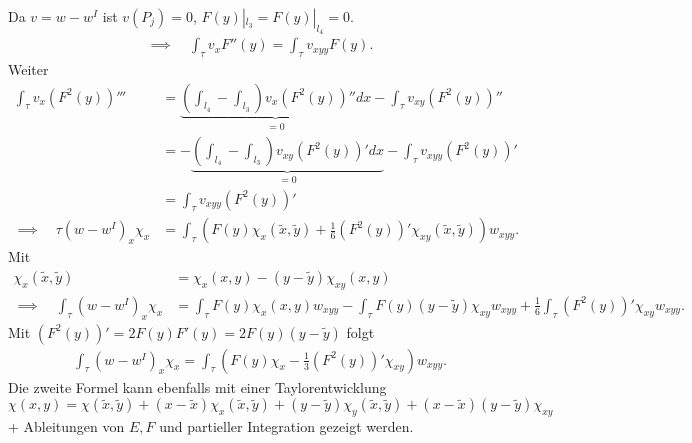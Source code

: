 \begin{beweis}
 Da $v = w - w^{I}$ ist $v(P_{j}) = 0$, $F(y)|_{l_{3}} = F(y)|_{l_{4}} = 0$.
\begin{align*}
  \implies \quad \int_{\tau} v_{x} F''(y) = \int_{\tau} v_{xyy}F(y). 
\end{align*}
Weiter
\begin{align*}
  \int_{\tau} v_{x}(F^{2}(y))''' &= \underbrace{(\int_{l_{4}} - \int_{l_{3}}) v_{x}(F^{2}(y))''dx}_{= 0} - \int_{\tau} v_{xy} (F^{2}(y))'' \\
  &= - \underbrace{(\int_{l_{4}} - \int_{l_{3}}) v_{xy}(F^{2}(y))'dx}_{= 0} - \int_{\tau} v_{xyy} (F^{2}(y))' \\
&= \int_{\tau} v_{xyy}(F^{2}(y))'\\
\implies \quad \tau (w - w^{I})_{x} \chi_{x} &= \int_{\tau} (F(y) \chi_{x}(\tilde x, \tilde y) + \frac 16 (F^{2}(y))' \chi_{xy}(\tilde x, \tilde y)) w_{xyy}.  
\end{align*}
Mit
\begin{align*}
  \chi_{x}(\tilde x, \tilde y) &= \chi_{x}(x, y) - (y - \tilde y)\chi_{xy}(x, y)\\
\implies \quad \int_{\tau}(w - w^{I})_{x} \chi_{x} &= \int_{\tau} F(y) \chi_{x}(x, y) w_{xyy}- \int_{\tau} F(y)(y - \tilde y) \chi_{xy} w_{xyy} + \frac 16 \int_{\tau}(F^{2}(y))' \chi_{xy} w_{xyy}.  
\end{align*}
Mit $(F^{2}(y))' = 2 F(y) F'(y) = 2 F(y)(y - \tilde y)$ folgt
\begin{align*}
  \int_{\tau} (w - w^{I})_{x} \chi_{x} = \int_{\tau}(F(y) \chi_{x} - \frac 13 (F^{2}(y))' \chi_{xy})w_{xyy}.
\end{align*}
Die zweite Formel kann ebenfalls mit einer Taylorentwicklung $\chi(x, y) = \chi(\tilde x, \tilde y) + (x - \tilde x)\chi_{x}(\tilde x, \tilde y) + (y - \tilde y)\chi_{y}(\tilde x, \tilde y)+ (x - \tilde x)(y - \tilde y)\chi_{xy}$ + Ableitungen von $E, F$ und partieller Integration gezeigt werden.
\end{beweis}


